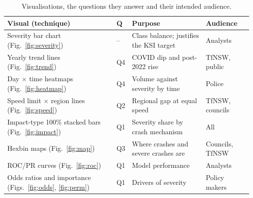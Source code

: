 \documentclass[11pt,a4paper]{article}
\begin{document}
\begin{table}[H]
\centering
\caption{Visualisations, the questions they answer and their intended audience.}
\label{tab:viz}
\small
\begin{tabularx}{\textwidth}{@{}P{4.3cm}P{1.3cm}LP{3.1cm}@{}}
\toprule
\textbf{Visual (technique)} & \textbf{Q} & \textbf{Purpose} & \textbf{Audience} \\
\midrule
Severity bar chart (Fig.~\ref{fig:severity}) & -- & Class balance; justifies the KSI target & Analysts \\
Yearly trend lines (Fig.~\ref{fig:trend}) & Q4 & COVID dip and post-2022 rise & TfNSW, public \\
Day $\times$ time heatmaps (Fig.~\ref{fig:heatmap}) & Q4 & Volume against severity by time & Police \\
Speed limit $\times$ region lines (Fig.~\ref{fig:speed}) & Q2 & Regional gap at equal speed & TfNSW, councils \\
Impact-type 100\% stacked bars (Fig.~\ref{fig:impact}) & Q1 & Severity share by crash mechanism & All \\
Hexbin maps (Fig.~\ref{fig:map}) & Q3 & Where crashes and severe crashes are & Councils, TfNSW \\
ROC/PR curves (Fig.~\ref{fig:roc}) & Q1 & Model performance & Analysts \\
Odds ratios and importance (Figs.~\ref{fig:odds}, \ref{fig:perm}) & Q1 & Drivers of severity & Policy makers \\
\bottomrule
\end{tabularx}
\end{table}
\end{document}
